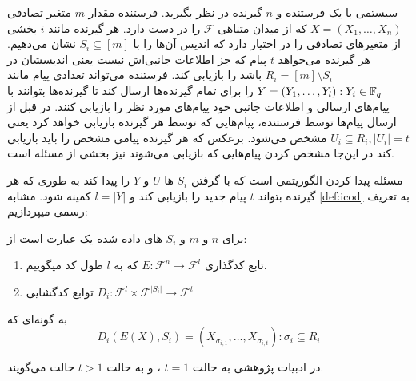 	سیستمی با یک فرستنده و 
	$n$
	گیرنده در نظر بگیرید. فرستنده مقدار
	$m$
	متغیر تصادفی
	$X = (X_1, \ldots, X_n)$
	که از میدان متناهی
	$\mathcal{F}$
	را در دست دارد. هر گیرنده مانند 
	$i$
	بخشی از متغیرهای تصادفی را در اختیار دارد که اندیس آن‌ها را با 
	$S_i \subseteq [m]$
	نشان می‌دهیم. هر گیرنده می‌خواهد 
	$t$
	پیام که جز اطلاعات جانبی‌اش نیست یعنی اندیسشان در
	$R_i = [m] \setminus S_i$
	باشد را بازیابی کند.
	فرستنده می‌تواند تعدادی پیام مانند
	$Y = (Y_1, \ldots, Y_l): Y_i \in {\mathbb{F}_q}$
	را برای تمام گیرنده‌ها ارسال کند تا گیرنده‌ها بتوانند با پیام‌های ارسالی و اطلاعات جانبی خود پیام‌های مورد نظر را بازیابی کنند. در
	\picod
	قبل از ارسال پیام‌ها توسط فرستنده، پیام‌هایی که توسط هر گیرنده بازیابی خواهد کرد یعنی
	$U_i \subseteq R_i,  |U_i| = t$
	 مشخص می‌شود. برعکس 
	\icod
	 که هر گیرنده پیامی مشخص را باید بازیابی کند در این‌جا مشخص کردن پیام‌هایی که بازیابی می‌شوند نیز بخشی از مسئله است.
	 
	 مسئله 
	 \picodt
	 پیدا کردن الگوریتمی است که با گرفتن 
	 $S_i$
	 ها
	 $U$
	 و
	 $Y$
	 را پیدا کند به طوری که هر گیرنده بتواند
	 $t$
	 پیام جدید را بازیابی کند و 
	 $l = |Y|$
	 کمینه شود. مشابه
	 \autoref{def:icod}
	 به تعریف رسمی
	 \picodt
	 میپردازیم:
\begin{definition}[\picodt]
	\label{def:picodt}
	برای
	$n$
	و
	$m$
	و
	$S_i$
	های داده شده یک
	\picodt
	عبارت است از:
	\begin{enumerate}
		\item 
		تابع کدگذاری
		$E: \mathcal{F}^n \rightarrow \mathcal{F}^l$
		که به 
		$l$
		طول کد میگوییم.
		\item 
		توابع کدگشایی 
		$D_i: \mathcal{F}^l \times \mathcal{F}^{|S_i|} \rightarrow \mathcal{F}^t$
	\end{enumerate}
	به گونه‌ای که
	$$D_i(E(X), S_i) = (X_{\sigma_{i,1}}, \ldots, X_{\sigma_{i,t}}): \sigma_i \subseteq R_i$$
\end{definition}

در ادبیات پژوهشی به حالت
$t = 1$
،
\picod
 و به حالت
$t > 1$
حالت
می‌گویند.

